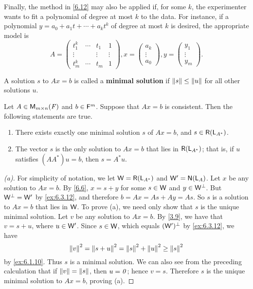 \begin{note}
	Finally, the method in \cref{6.12} may also be applied if, for some \(k\), the experimenter wants to fit a polynomial of degree at most \(k\) to the data.
	For instance, if a polynomial \(y = a_0 + a_1 t + \cdots + a_k t^k\) of degree at most \(k\) is desired, the appropriate model is
	\[
		A = \begin{pmatrix}
			t_1^k  & \cdots & t_1    & 1      \\
			\vdots &        & \vdots & \vdots \\
			t_m^k  & \cdots & t_m    & 1
		\end{pmatrix}, x = \begin{pmatrix}
			a_k    \\
			\vdots \\
			a_0
		\end{pmatrix}, y = \begin{pmatrix}
			y_1    \\
			\vdots \\
			y_m
		\end{pmatrix}.
	\]
\end{note}

\begin{defn}\label{6.3.7}
	A solution \(s\) to \(Ax = b\) is called a \textbf{minimal solution} if \(\left\lVert s\right\rVert \leq \left\lVert u\right\rVert\) for all other solutions \(u\).
\end{defn}

\begin{thm}\label{6.13}
	Let \(A \in \MS\) and \(b \in \mathsf{F}^m\).
	Suppose that \(Ax = b\) is consistent.
	Then the following statements are true.
	\begin{enumerate}
		\item There exists exactly one minimal solution \(s\) of \(Ax = b\), and \(s \in \rg{\L_{A^*}}\).
		\item The vector \(s\) is the only solution to \(Ax = b\) that lies in \(\rg{\L_{A^*}}\);
		      that is, if \(u\) satisfies \((A A^*) u = b\), then \(s = A^* u\).
	\end{enumerate}
\end{thm}

\begin{proof}[(a)]
	For simplicity of notation, we let \(\W = \rg{\L_{A^*}}\) and \(\W' = \ns{\L_A}\).
	Let \(x\) be any solution to \(Ax = b\).
	By \cref{6.6}, \(x = s + y\) for some \(s \in \mathsf{W}\) and \(y \in \mathsf{W}^{\perp}\).
	But \(\mathsf{W}^{\perp} = \mathsf{W}'\) by \cref{ex:6.3.12}, and therefore \(b = Ax = As + Ay = As\).
	So \(s\) is a solution to \(Ax = b\) that lies in \(\mathsf{W}\).
	To prove (a), we need only show that \(s\) is the unique minimal solution.
	Let \(v\) be any solution to \(Ax = b\).
	By \cref{3.9}, we have that \(v = s + u\), where \(u \in \mathsf{W}'\).
	Since \(s \in \mathsf{W}\), which equals \((\mathsf{W}')^{\perp}\) by \cref{ex:6.3.12}, we have
	\[
		\left\lVert v\right\rVert^2 = \left\lVert s + u\right\rVert^2 = \left\lVert s\right\rVert^2 + \left\lVert u\right\rVert^2 \geq \left\lVert s\right\rVert^2
	\]
	by \cref{ex:6.1.10}.
	Thus \(s\) is a minimal solution.
	We can also see from the preceding calculation that if \(\left\lVert v\right\rVert = \left\lVert s\right\rVert\), then \(u = \mathit{0}\);
	hence \(v = s\).
	Therefore \(s\) is the unique minimal solution to \(Ax = b\), proving (a).
\end{proof}


